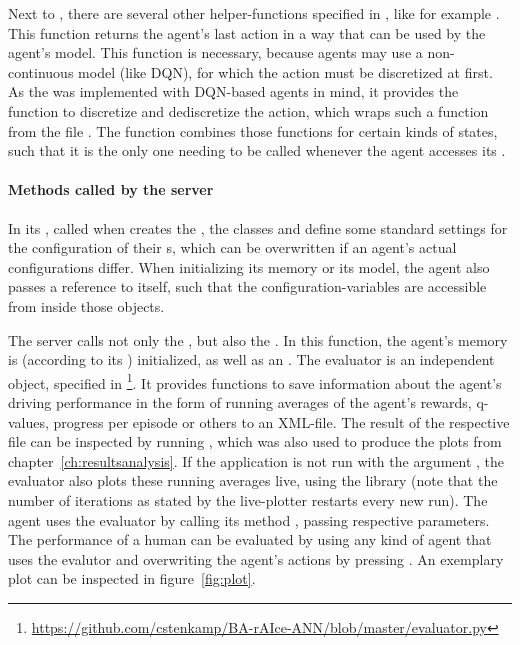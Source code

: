 Next to , there are several other helper-functions specified in , like for example . This function returns the agent's last action in a way that can be used by the agent's model. This function is necessary, because agents may use a non-continuous model (like DQN), for which the action must be discretized at first. As the  was implemented with DQN-based agents in mind, it provides the function to discretize and dediscretize the action, which wraps such a function from the file . The function  combines those functions for certain kinds of states, such that it is the only one needing to be called whenever the agent accesses its .

\paragraph{Methods called by the server}

In its , called when  creates the , the classes  and  define some standard settings for the configuration of their s, which can be overwritten if an agent's actual configurations differ. When initializing its memory or its model, the agent also passes a reference to itself, such that the configuration-variables are accessible from inside those objects. 

The server calls not only the , but also the . In this function, the agent's memory is (according to its ) initialized, as well as an . The evaluator is an independent object, specified in \footnote{\url{https://github.com/cstenkamp/BA-rAIce-ANN/blob/master/evaluator.py}}. It provides functions to save information about the agent's driving performance in the form of running averages of the agent's rewards, q-values, progress per episode or others to an XML-file. The result of the respective file can be inspected by running , which was also used to produce the plots from chapter~\ref{ch:resultsanalysis}. If the application is not run with the argument , the evaluator also plots these running averages live, using the library  (note that the number of iterations as stated by the live-plotter restarts every new run). The agent uses the evaluator by calling its method , passing respective parameters. The performance of a human can be evaluated by using any kind of agent that uses the evalutor and overwriting the agent's actions by pressing . An exemplary plot can be inspected in figure~\ref{fig:plot}.


